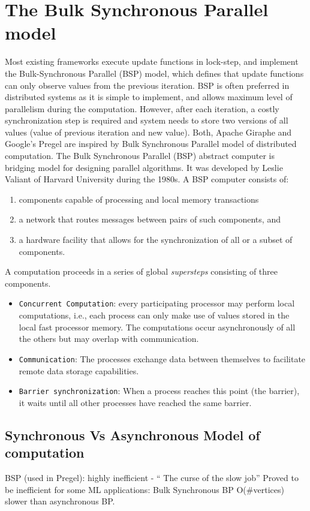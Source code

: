 \documentclass[letterpaper,twocolumn,10pt]{article}
\begin{document}
\section*{The Bulk Synchronous Parallel model}
\label{sec:bsp}
Most existing frameworks execute update functions in lock-step, and implement the Bulk-Synchronous Parallel (BSP) model, which defines that update functions can only observe values from the previous iteration. BSP is often preferred in distributed systems as it is simple to implement, and allows maximum level of parallelism during the computation. However, after each iteration, a costly synchronization step is required and system needs to store two versions of all values (value of previous iteration and new value).
Both, Apache Giraphe and Google's Pregel are inspired by Bulk Synchronous Parallel model of distributed computation.
The Bulk Synchronous Parallel (BSP) abstract computer is bridging model for designing parallel algorithms. It was developed by Leslie Valiant of Harvard University during the 1980s. A BSP computer consists of:
\begin{enumerate}
\item components capable of processing and local memory transactions
\item a network that routes messages between pairs of such components, and
\item a hardware facility that allows for the synchronization of all or a subset of components.
\end{enumerate}
A computation proceeds in a series of global \textit{supersteps} consisting of three components.
\begin{itemize}
\item {\tt Concurrent Computation}: every participating processor may perform local computations, i.e., each process can only make use of values stored in the local fast processor memory. The computations occur asynchronously of all the others but may overlap with communication.
\item {\tt Communication}: The processes exchange data between themselves to facilitate remote data storage capabilities.
\item {\tt Barrier synchronization}: When a process reaches this point (the barrier), it waits until all other processes have reached the same barrier.
\end{itemize}

\subsection{Synchronous Vs Asynchronous Model of computation}
BSP (used in Pregel): highly inefficient - `` The curse of the slow job''
Proved to be inefficient for some ML applications:
	Bulk Synchronous BP O(\#vertices) slower than asynchronous BP.

{\footnotesize 
}


\theendnotes
\end{document}
